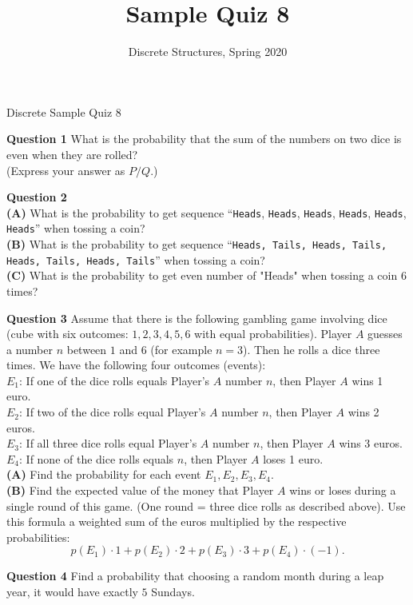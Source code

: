 \documentclass[jou]{apa6}
\title{Sample Quiz 8}
\author{Discrete Structures, Spring 2020}
\affiliation{RBS}
\begin{document}
\thispagestyle{empty}

\twocolumn
{\Large Discrete Sample Quiz 8}

\vspace{10pt}
{\bf Question 1} 
What is the probability that the sum of the numbers on two dice is even when they are rolled?\\
(Express your answer as $P/Q$.)

\vspace{10pt}
{\bf Question 2}\\
{\bf (A)} What is the probability to get sequence ``{\tt Heads}, {\tt Heads}, {\tt Heads}, 
{\tt Heads}, {\tt Heads}, {\tt Heads}'' when 
tossing a coin?\\
{\bf (B)} What is the probability to get sequence ``{\tt Heads, Tails, Heads, Tails, Heads, Tails, Heads, Tails}'' when 
tossing a coin?\\
{\bf (C)} What is the probability to get even number of "Heads" when tossing a coin 6 times?

\vspace{10pt}
{\bf Question 3}
Assume that there is the following gambling game involving dice (cube with six outcomes: $1,2,3,4,5,6$ with 
equal probabilities). Player $A$ guesses a number $n$ between $1$ and $6$ (for example $n = 3$). Then he rolls a dice three times. 
We have the following four outcomes (events):\\
$E_1$: If one of the dice rolls equals Player's $A$ number $n$, then Player $A$ wins 1 euro.\\
$E_2$: If two of the dice rolls equal Player's $A$ number $n$, then Player $A$ wins 2 euros.\\
$E_3$: If all three dice rolls equal Player's $A$ number $n$, then Player $A$ wins 3 euros.\\
$E_4$: If none of the dice rolls equals $n$, then Player $A$ loses 1 euro.\\
{\bf (A)} Find the probability for each event $E_1,E_2,E_3,E_4$.\\
{\bf (B)} Find the expected value of the money that Player $A$ wins or loses during a single round of this game. (One round = three 
dice rolls as described above). Use this formula \textendash{} a weighted sum of the euros multiplied by the respective probabilities:
$$p(E_1)\cdot 1 + p(E_2)\cdot 2 + p(E_3)\cdot 3 + p(E_4)\cdot (-1).$$


\vspace{10pt}
{\bf Question 4} Find a probability that choosing a random month during a leap year, it would have exactly $5$ Sundays.
\end{document}
